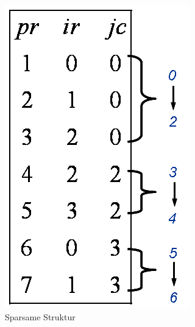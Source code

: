 \begin{figure}[htbp]
\begin{center}
\begin{minipage}[t]{0.4\linewidth}
			\includegraphics[width=\linewidth]{.//pic//numerische_sparse1}
			\caption{Sparsame Struktur}
			\label{numerische_sparse1}
		\end{minipage}
		\qquad
		\begin{minipage}[t]{0.4\linewidth}
			\centering

\end{minipage}
\end{center}
\end{figure}
